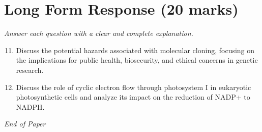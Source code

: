 \documentclass[12pt]{article}
\begin{document}
\section*{Long Form Response (20 marks)}
\textit{Answer each question with a clear and complete explanation.}
\begin{enumerate}[label=\arabic*.]
\setcounter{enumi}{10}
\item Discuss the potential hazards associated with molecular cloning, focusing on the implications for public health, biosecurity, and ethical concerns in genetic research.
\item Discuss the role of cyclic electron flow through photosystem I in eukaryotic photosynthetic cells and analyze its impact on the reduction of NADP+ to NADPH.
\end{enumerate}

\vfill
\noindent\textit{End of Paper}
\end{document}
